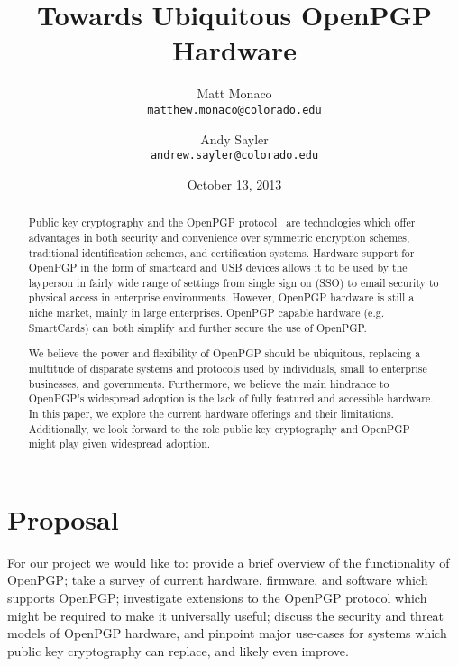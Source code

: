 \documentclass[letterpaper,twocolumn,10pt]{article}
\begin{document}
%
%

\title{\Large \bf
  Towards Ubiquitous OpenPGP Hardware
}

\date{October 13, 2013}

\author{
  Matt Monaco \\
  \texttt{matthew.monaco@colorado.edu}
  \and
  Andy Sayler \\
  \texttt{andrew.sayler@colorado.edu}
}

\maketitle

\begin{abstract}

Public key cryptography and the OpenPGP protocol~\cite{rfc4880} are
technologies which offer advantages in both security and convenience
over symmetric encryption schemes, traditional identification schemes,
and certification systems. Hardware support for OpenPGP in the form of
smartcard and USB devices allows it to be used by the layperson in
fairly wide range of settings from single sign on (SSO) to email
security to physical access in enterprise environments. However,
OpenPGP hardware is still a niche market, mainly in large
enterprises. OpenPGP capable hardware (e.g. SmartCards) can both
simplify and further secure the use of OpenPGP.

We believe the power and flexibility of OpenPGP should be ubiquitous, replacing
a multitude of disparate systems and protocols used by individuals, small to
enterprise businesses, and governments. Furthermore, we believe the main
hindrance to OpenPGP's widespread adoption is the lack of fully featured and
accessible hardware. In this paper, we explore the current hardware offerings
and their limitations. Additionally, we look forward to the role public key
cryptography and OpenPGP might play given widespread adoption.

\end{abstract}

%
%

\section{Proposal}

For our project we would like to: provide a brief overview of the
functionality of OpenPGP; take a survey of current hardware, firmware,
and software which supports OpenPGP; investigate extensions to the
OpenPGP protocol which might be required to make it universally
useful; discuss the security and threat models of OpenPGP hardware,
and pinpoint major use-cases for systems which public key cryptography
can replace, and likely even improve.
\end{document}
